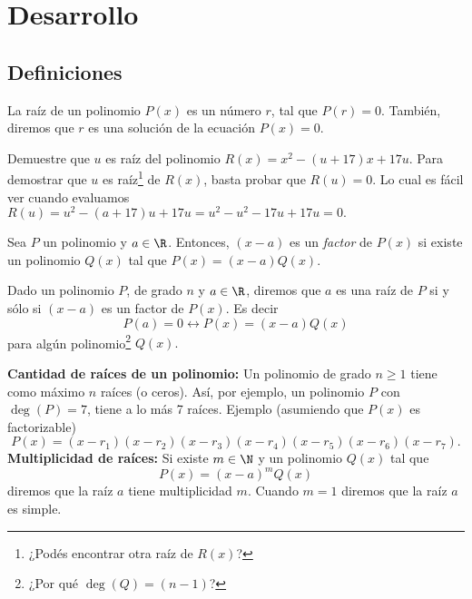 \section{Desarrollo}\label{sec:desarrollo}

\subsection{Definiciones}
{
    \begin{section-definition}
        La raíz de un polinomio $P(x)$ es un número $r$, tal que $P(r) = 0$. También, diremos que $r$ es una solución de la ecuación $P(x) = 0$.
    \end{section-definition}

    \begin{example}
        Demuestre que $u$ es raíz del polinomio $R(x) = x^2 - (u + 17) x + 17u$.
        \exampleProof
        {
            Para demostrar que $u$ es raíz\footnote{¿Podés encontrar otra raíz de $R(x)$?} de $R(x)$, basta probar que $R(u) = 0$. Lo cual es fácil ver cuando evaluamos $R(u) = u^2 - (a+17)u + 17u = u^2 - u^2 - 17u + 17u = 0.$
        }
    \end{example}


    \begin{section-definition}
        Sea $P$ un polinomio y $a \in \R$. Entonces, $(x - a)$ es un \emph{factor} de $P(x)$ si existe un polinomio $Q(x)$ tal que $P(x) = (x-a)Q(x).$
    \end{section-definition}

    \begin{theorem}
        Dado un polinomio $P$, de grado $n$ y $a \in \R$, diremos que $a$ es una raíz de $P$ si y sólo si $(x-a)$ es un factor de $P(x)$. Es decir \[P(a) = 0 \leftrightarrow P(x) = (x-a)Q(x)\] para algún polinomio\footnote{¿Por qué $\deg{(Q)} = (n-1)$?} $Q(x).$
    \end{theorem}

    \textbf{Cantidad de raíces de un polinomio:} Un polinomio de grado $n\geq 1$ tiene como máximo $n$ raíces (o ceros). Así, por ejemplo, un polinomio $P$ con $\deg{(P)} = 7$, tiene a lo más 7 raíces. Ejemplo (asumiendo que $P(x)$ es factorizable) \[P(x) = (x - r_1)(x - r_2)(x - r_3)(x - r_4)(x - r_5)(x - r_6)(x - r_7).\]
    \textbf{Multiplicidad de raíces:} Si existe $m \in \N$ y un polinomio $Q(x)$ tal que \[P(x) = (x - a)^m Q(x)\] diremos que la raíz $a$ tiene multiplicidad $m$. Cuando $m = 1$ diremos que la raíz $a$ es simple.
}
\label{subsec:definiciones}

